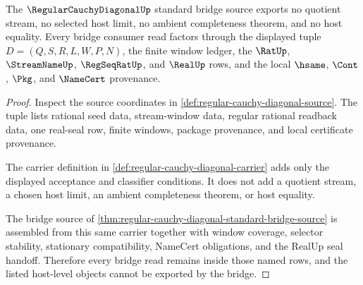 \begin{theorem}
\label{thm:regular-cauchy-diagonal-bridge-non-escape}
The $\RegularCauchyDiagonalUp$ standard bridge source exports no quotient stream, no selected host limit, no ambient completeness theorem, and no host equality. Every bridge consumer read factors through the displayed tuple $D=(Q,S,R,L,W,P,N)$, the finite window ledger, the $\RatUp$, $\StreamNameUp$, $\RegSeqRatUp$, and $\RealUp$ rows, and the local $\hsame$, $\Cont$, $\Pkg$, and $\NameCert$ provenance.
\end{theorem}
\begin{proof}
Inspect the source coordinates in \autoref{def:regular-cauchy-diagonal-source}. The tuple lists rational seed data, stream-window data, regular rational readback data, one real-seal row, finite windows, package provenance, and local certificate provenance.

The carrier definition in \autoref{def:regular-cauchy-diagonal-carrier} adds only the displayed acceptance and classifier conditions. It does not add a quotient stream, a chosen host limit, an ambient completeness theorem, or host equality.

The bridge source of \autoref{thm:regular-cauchy-diagonal-standard-bridge-source} is assembled from this same carrier together with window coverage, selector stability, stationary compatibility, NameCert obligations, and the RealUp seal handoff. Therefore every bridge read remains inside those named rows, and the listed host-level objects cannot be exported by the bridge.
\end{proof}

